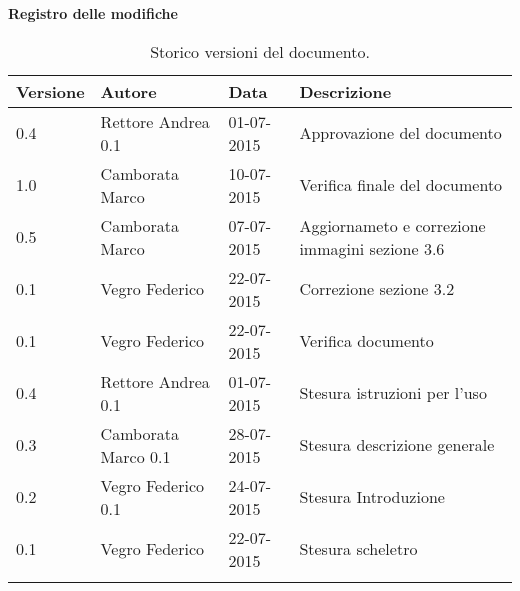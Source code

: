\begin{Large}
	\textbf{Registro delle modifiche}
\end{Large}

\begin{longtable}{|l|l|l|p{}|}
\hline
\textbf{Versione} & \textbf{Autore} & \textbf{Data} & \textbf{Descrizione} \\
\hline
0.4 & Rettore Andrea 0.1 & 01-07-2015 & Approvazione del documento \\
\hline
1.0 & Camborata Marco & 10-07-2015 & Verifica finale del documento \\
\hline
0.5 & Camborata Marco & 07-07-2015 & Aggiornameto e correzione immagini sezione 3.6 \\
\hline
0.1 & Vegro Federico & 22-07-2015 & Correzione sezione 3.2 \\
\hline
0.1 & Vegro Federico & 22-07-2015 & Verifica documento \\
\hline
0.4 & Rettore Andrea 0.1 & 01-07-2015 & Stesura istruzioni per l'uso \\
\hline
0.3 & Camborata Marco 0.1 & 28-07-2015 & Stesura descrizione generale \\
\hline
0.2 & Vegro Federico 0.1 & 24-07-2015 & Stesura Introduzione \\
\hline
0.1 & Vegro Federico & 22-07-2015 & Stesura scheletro \\
\hline
\caption{Storico versioni del documento.}
\end{longtable}
